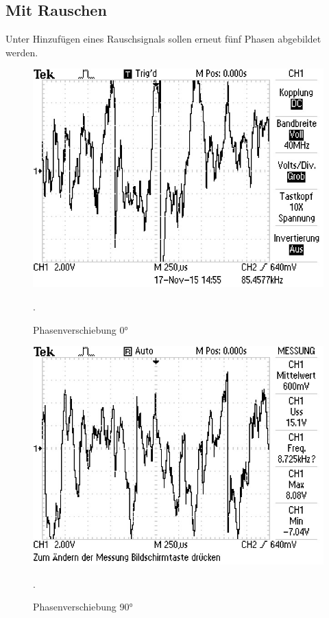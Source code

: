  \subsection {Mit Rauschen}
 Unter Hinzufügen eines Rauschsignals sollen erneut fünf Phasen abgebildet werden.

 \begin{figure}
   \centering
   \includegraphics[width=\textwidth]{bilder/Mit Rauschen/1.JPG}
 \caption{Phasenverschiebung 0°}.
   \label{fig:1}
 \end{figure}

 \begin{figure}
   \centering
   \includegraphics[width=\textwidth]{bilder/Mit Rauschen/2.JPG}
 \caption{Phasenverschiebung 90°}.
   \label{fig:2}
 \end{figure}

